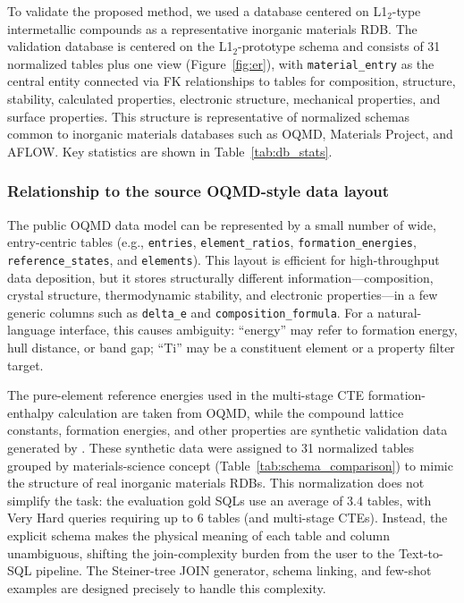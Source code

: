 \documentclass{npj-compt.mater}
\begin{document}
To validate the proposed method, we used a database centered on
L1$_2$-type intermetallic compounds as a representative inorganic
materials RDB.
The validation database is centered on the L1$_2$-prototype schema and consists of
31 normalized tables plus one view (Figure~\ref{fig:er}), with
\texttt{material\_entry} as the central entity connected via FK
relationships to tables for composition, structure, stability,
calculated properties, electronic structure, mechanical properties,
and surface properties.
This structure is representative of normalized schemas common to
inorganic materials databases such as OQMD, Materials Project, and
AFLOW.
Key statistics are shown in Table~\ref{tab:db_stats}.

\subsubsection{Relationship to the source OQMD-style data layout}

The public OQMD data model can be represented by a small number of
wide, entry-centric tables (e.g., \texttt{entries},
\texttt{element\_ratios}, \texttt{formation\_energies},
\texttt{reference\_states}, and \texttt{elements}).
This layout is efficient for high-throughput data deposition, but it
stores structurally different information---composition, crystal
structure, thermodynamic stability, and electronic properties---in a
few generic columns such as \texttt{delta\_e} and
\texttt{composition\_formula}.
For a natural-language interface, this causes ambiguity:
``energy'' may refer to formation energy, hull distance, or band gap;
``Ti'' may be a constituent element or a property filter target.

The pure-element reference energies used in the multi-stage CTE
formation-enthalpy calculation are taken from OQMD, while the
compound lattice constants, formation energies, and other properties
are synthetic validation data generated by
.  These synthetic data
were assigned to 31 normalized tables grouped by materials-science
concept (Table~\ref{tab:schema_comparison}) to mimic the structure
of real inorganic materials RDBs.
This normalization does not simplify the task: the evaluation gold
SQLs use an average of 3.4 tables, with Very Hard queries requiring
up to 6 tables (and multi-stage CTEs).
Instead, the explicit schema makes the physical meaning of each
table and column unambiguous, shifting the join-complexity burden
from the user to the Text-to-SQL pipeline.
The Steiner-tree JOIN generator, schema linking, and few-shot examples
are designed precisely to handle this complexity.
\end{document}
